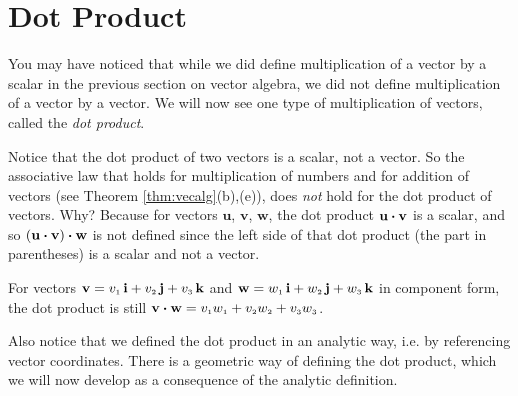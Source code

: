 \newpage
\section{Dot Product}
You may have noticed that while we did define multiplication of a vector by a scalar in the previous section on
vector algebra, we did not define multiplication of a vector by a vector. We will now see one type of
multiplication of vectors, called the \emph{dot product}.


Notice that the dot product of two vectors is a scalar, not a vector. 
So the associative law that holds for multiplication of numbers and for addition of vectors (see
Theorem \ref{thm:vecalg}(b),(e)), does \emph{not} hold for the dot product of vectors. Why? Because for vectors
$\mathbf{u}$, $\mathbf{v}$, $\mathbf{w}$, the dot product $\mathbf{u} \bm{\cdot} \mathbf{v}$ is a scalar, and so
$(\mathbf{u} \bm{\cdot} \mathbf{v}) \bm{\cdot} \mathbf{w}$ is not defined since the left side of that dot product
(the part in parentheses) is a scalar and not a vector.

For vectors $\mathbf{v} = v_{\scriptscriptstyle 1}\,\textbf{i} + v_{\scriptscriptstyle 2}\,\textbf{j} + v_{\scriptscriptstyle 3}\,\textbf{k}$ and $\mathbf{w} = w_{\scriptscriptstyle 1}\,\textbf{i} + w_{\scriptscriptstyle 2}\,\textbf{j} + w_{\scriptscriptstyle 3}\,\textbf{k}$ in component form, the dot product is
still $\mathbf{v} \bm{\cdot} \mathbf{w} = v_{\scriptscriptstyle 1}w_{\scriptscriptstyle 1} + v_{\scriptscriptstyle 2}w_{\scriptscriptstyle 2} +
v_{\scriptscriptstyle 3}w_{\scriptscriptstyle 3}$.

Also notice that we defined the dot product in an analytic way, i.e. by referencing vector coordinates. There is
a geometric way of defining the dot product, which we will now develop as a consequence of the analytic
definition.


